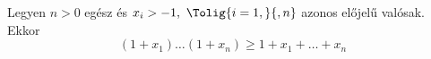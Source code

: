 Legyen $n>0$ egész és $x_{i}>-1,\ \Tolig{i=1,}{,n}$ azonos előjelű valósak. Ekkor
$$
	(1+x_{1})\hdots (1+x_{n}) \ge 1 + x_{1}+\hdots +x_{n}
$$
